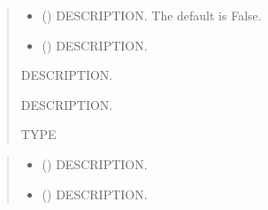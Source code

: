 \documentclass[letterpaper,10pt,english]{sphinxmanual}
\begin{document}
\begin{fulllineitems}
\begin{fulllineitems}
\begin{quote}
\begin{description}
\begin{itemize}
\item {} 
\sphinxAtStartPar
{} (\sphinxstyleliteralemphasis{\sphinxupquote{, }}) \textendash{} DESCRIPTION. The default is False.

\item {} 
\sphinxAtStartPar
{} () \textendash{} DESCRIPTION.

\end{itemize}

\sphinxAtStartPar
{} \textendash{} DESCRIPTION.

\sphinxAtStartPar
{} \textendash{} DESCRIPTION.

\sphinxAtStartPar
TYPE

\end{description}\end{quote}

\end{fulllineitems}


\begin{fulllineitems}
\label{\detokenize{query:ggcas.query.GaiaQuery.getPhotometry}}
\pysigstartsignatures
{}
\pysigstopsignatures\begin{quote}\begin{description}
\begin{itemize}
\item {} 
\sphinxAtStartPar
{} () \textendash{} DESCRIPTION.

\item {} 
\sphinxAtStartPar
{} () \textendash{} DESCRIPTION.


\end{itemize}
\end{description}
\end{quote}
\end{fulllineitems}
\end{fulllineitems}
\end{document}
